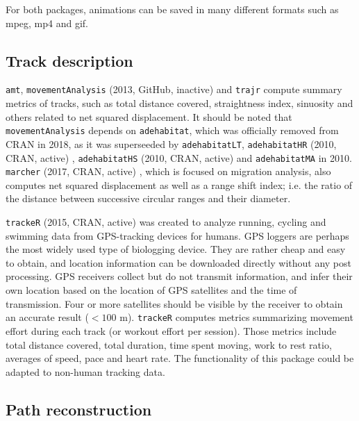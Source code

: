 \documentclass[a4paper,12pt]{article}
\newcommand{\Rpkg}[1]{\texttt{#1}}
\begin{document}
	For both packages, animations can be saved in many different formats such as mpeg, mp4 and gif. 
	
	\subsection*{Track description}
	
	\Rpkg{amt}, \Rpkg{movementAnalysis} (2013, GitHub, inactive) \citep{RmovementAnalysis} and \Rpkg{trajr} compute summary metrics of tracks, such as total distance covered, straightness index, sinuosity and others related to net squared displacement. It should be noted that \Rpkg{movementAnalysis} depends on \Rpkg{adehabitat}, which was officially removed from CRAN in 2018, as it was superseeded by \Rpkg{adehabitatLT}, \Rpkg{adehabitatHR} (2010, CRAN, active) \citep{Calenge2006}, \Rpkg{adehabitatHS} (2010, CRAN, active) \citep{Calenge2006} and \Rpkg{adehabitatMA} \citep{Calenge2006} in 2010. \Rpkg{marcher} (2017, CRAN, active) \citep{Rmarcher}, which is focused on migration analysis, also computes net squared displacement as well as a range shift index; i.e. the ratio of the distance between successive circular ranges and their diameter. 
	
	\Rpkg{trackeR} (2015, CRAN, active) \citep{Frick2017} was created to analyze running, cycling and swimming data from GPS-tracking devices for humans. GPS loggers are perhaps the most widely used type of biologging device. They are rather cheap and easy to obtain, and location information can be downloaded directly without any post processing. GPS receivers collect but do not transmit information, and infer their own location based on the location of GPS satellites and the time of transmission. Four or more satellites should be visible by the receiver to obtain an accurate result ($<100$ m). \Rpkg{trackeR} computes metrics summarizing movement effort during each track (or workout effort per session). Those metrics include total distance covered, total duration, time spent moving, work to rest ratio, averages of speed, pace and heart rate. The functionality of this package could be adapted to non-human tracking data.
	
	
	\subsection*{Path reconstruction}
	
\end{document}

